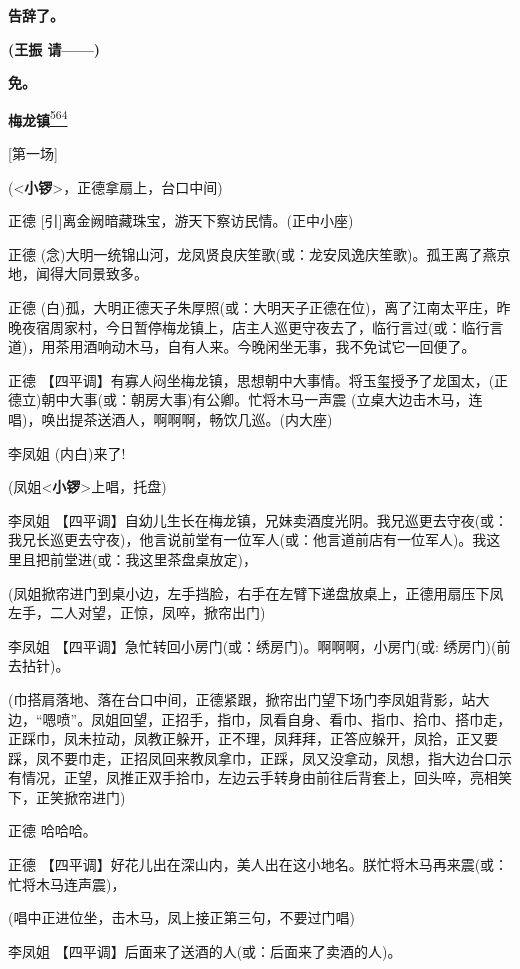 \textbf{告辞了。}

\textbf{(王振 请------)}

\textbf{免。}

\textbf{梅龙镇}\protect\hyperlink{fn564}{\textsuperscript{564}}

{[}第一场{]}

(\textless{}\textbf{小锣}\textgreater{}，正德拿扇上，台口中间)

正德 {[}引{]}离金阙暗藏珠宝，游天下察访民情。(正中小座)

正德
(念)大明一统锦山河，龙凤贤良庆笙歌(或：龙安凤逸庆笙歌)。孤王离了燕京地，闻得大同景致多。

正德
(白)孤，大明正德天子朱厚照(或：大明天子正德在位)，离了江南太平庄，昨晚夜宿周家村，今日暂停梅龙镇上，店主人巡更守夜去了，临行言过(或：临行言道)，用茶用酒响动木马，自有人来。今晚闲坐无事，我不免试它一回便了。

正德
【四平调】有寡人闷坐梅龙镇，思想朝中大事情。将玉玺授予了龙国太，(正德立)朝中大事(或：朝房大事)有公卿。忙将木马一声震
(立桌大边击木马，连唱)，唤出提茶送酒人，啊啊啊，畅饮几巡。(内大座)

李凤姐 (内白)来了!

(凤姐\textless{}\textbf{小锣}\textgreater{}上唱，托盘)

李凤姐
【四平调】自幼儿生长在梅龙镇，兄妹卖酒度光阴。我兄巡更去守夜(或：我兄长巡更去守夜)，他言说前堂有一位军人(或：他言道前店有一位军人)。我这里且把前堂进(或：我这里茶盘桌放定)，

(凤姐掀帘进门到桌小边，左手挡脸，右手在左臂下递盘放桌上，正德用扇压下凤左手，二人对望，正惊，凤啐，掀帘出门)

李凤姐 【四平调】急忙转回小房门(或：绣房门)。啊啊啊，小房门(或:
绣房门)(前去拈针)。

(巾搭肩落地、落在台口中间，正德紧跟，掀帘出门望下场门李凤姐背影，站大边，``嗯喷''。凤姐回望，正招手，指巾，凤看自身、看巾、指巾、拾巾、搭巾走，正踩巾，凤未拉动，凤教正躲开，正不理，凤拜拜，正答应躲开，凤拾，正又要踩，凤不要巾走，正招凤回来教凤拿巾，正踩，凤又没拿动，凤想，指大边台口示有情况，正望，凤推正双手拾巾，左边云手转身由前往后背套上，回头啐，亮相笑下，正笑掀帘进门)

正德 哈哈哈。

正德
【四平调】好花儿出在深山内，美人出在这小地名。朕忙将木马再来震(或：忙将木马连声震)，

(唱中正进位坐，击木马，凤上接正第三句，不要过门唱)

李凤姐 【四平调】后面来了送酒的人(或：后面来了卖酒的人)。

